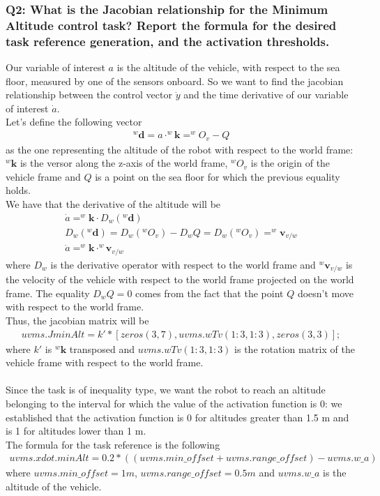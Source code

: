 \documentclass{article}
\begin{document}
\subsubsection{Q2: What is the Jacobian relationship for the Minimum Altitude control task? Report the formula for the desired task reference generation, and the activation thresholds.}
Our variable of interest $ a $ is the altitude of the vehicle, with respect to the sea floor, measured by one of the sensors onboard. So we want to find the jacobian relationship between the control vector $ \dot{y} $ and the time derivative of our variable of interest $ \dot{a} $. \\
Let's define the following vector
\begin{gather*}
	^{w}\boldsymbol{d} = a \cdot ^{w}\boldsymbol{k} = ^{w}O_{v} - Q
\end{gather*}
as the one representing the altitude of the robot with respect to the world frame:$ ^{w}\boldsymbol{k} $ is the versor along the z-axis of the world frame, $ ^{w}O_{v} $ is the origin of the vehicle frame and $ Q $ is a point on the sea floor for which the previous equality holds. \\
We have that the derivative of the altitude will be
\begin{gather*}
	\dot{a} = ^{w}\boldsymbol{k} \cdot D_{w}(^{w}\boldsymbol{d}) \\
	D_{w}(^{w}\boldsymbol{d}) = D_{w}(^{w}O_{v}) - D_{w}Q = D_{w}(^{w}O_{v}) = ^{w}\boldsymbol{v}_{v/w} \\
	\dot{a} = ^{w}\boldsymbol{k} \cdot ^{w}\boldsymbol{v}_{v/w}
\end{gather*}
where $ D_{w} $ is the derivative operator with respect to the world frame and $ ^{w}\boldsymbol{v}_{v/w} $ is the velocity of the vehicle with respect to the world frame projected on the world frame. The equality $ D_{w}Q = 0 $ comes from the fact that the point $ Q $ doesn't move with respect to the world frame. \\
Thus, the jacobian matrix will be
\begin{gather*}
	uvms.JminAlt = k' * [zeros(3, 7), uvms.wTv(1:3, 1:3), zeros(3, 3)];
\end{gather*}
where $ k' $ is $ ^{w}\boldsymbol{k} $ transposed and $ uvms.wTv(1:3, 1:3) $ is the rotation matrix of the vehicle frame with respect to the world frame. \\ \\
Since the task is of inequality type, we want the robot to reach an altitude belonging to the interval for which the value of the activation function is 0: we established that the activation function is 0 for altitudes greater than 1.5 m and is 1 for altitudes lower than 1 m. \\
The formula for the task reference is the following
\begin{gather*}
	uvms.xdot.minAlt = 0.2 * ((uvms.min\_offset + uvms.range\_offset) - uvms.w\_a)
\end{gather*}
where $ uvms.min\_offset = 1 m $, $ uvms.range\_offset = 0.5 m $ and $ uvms.w\_a $ is the altitude of the vehicle.
\end{document}
